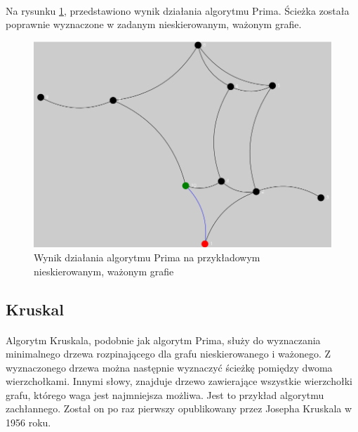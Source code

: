\paragraph{}
Na rysunku \ref{fig:prim}, przedstawiono wynik działania algorytmu Prima. 
Ścieżka została poprawnie wyznaczone w zadanym nieskierowanym, ważonym grafie.
\begin{figure}[!h]
 \centering
 \includegraphics[width=1.0\textwidth]{algorithms/prim}
 \caption{Wynik działania algorytmu Prima na przykładowym nieskierowanym, ważonym grafie}
 \label{fig:prim}
\end{figure}

\subsection{Kruskal}
\paragraph{}
Algorytm Kruskala, podobnie jak algorytm Prima, służy do wyznaczania minimalnego drzewa rozpinającego dla grafu nieskierowanego i ważonego. 
Z wyznaczonego drzewa można następnie wyznaczyć ścieżkę pomiędzy dwoma wierzchołkami.
Innymi słowy, znajduje drzewo zawierające wszystkie wierzchołki grafu, którego waga jest najmniejsza możliwa. 
Jest to przykład algorytmu zachłannego.
Został on po raz pierwszy opublikowany przez Josepha Kruskala w 1956 roku.

